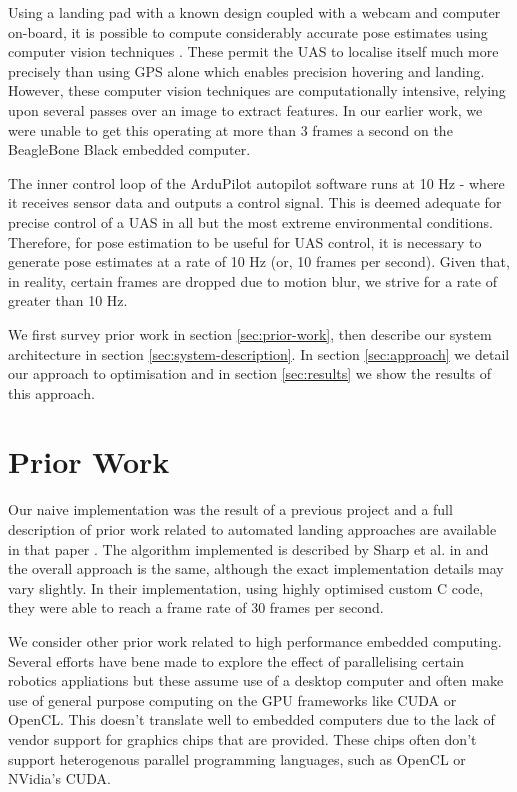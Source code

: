 \documentclass{acm_proc_article-sp}
\begin{document}
Using a landing pad with a known design coupled with a webcam and computer on-board, it is possible to compute considerably accurate pose estimates using computer vision techniques \cite{berzanaccurate}. These permit the UAS to localise itself much more precisely than using GPS alone which enables precision hovering and landing. However, these computer vision techniques are computationally intensive, relying upon several passes over an image to extract features. In our earlier work, we were unable to get this operating at more than 3 frames a second on the BeagleBone Black embedded computer. 

The inner control loop of the ArduPilot autopilot software runs at 10 Hz - where it receives sensor data and outputs a control signal. This is deemed adequate for precise control of a UAS in all but the most extreme environmental conditions. Therefore, for pose estimation to be useful for UAS control, it is necessary to generate pose estimates at a rate of 10 Hz (or, 10 frames per second). Given that, in reality, certain frames are dropped due to motion blur, we strive for a rate of greater than 10 Hz.

We first survey prior work in section \ref{sec:prior-work}, then describe our system architecture in section \ref{sec:system-description}. In section \ref{sec:approach} we detail our approach to optimisation and in section \ref{sec:results} we show the results of this approach.

\section{Prior Work\label{sec:prior-work}}
Our naive implementation was the result of a previous project and a full description of prior work related to automated landing approaches are available in that paper \cite{berzanaccurate}. The algorithm implemented is described by Sharp et al. in \cite{sharp_et_al_2001} and the overall approach is the same, although the exact implementation details may vary slightly. In their implementation, using highly optimised custom C code, they were able to reach a frame rate of 30 frames per second. 

We consider other prior work related to high performance embedded computing. Several efforts have bene made to explore the effect of parallelising certain robotics appliations but these assume use of a desktop computer and often make use of general purpose computing on the GPU frameworks like CUDA or OpenCL. This doesn't translate well to embedded computers due to the lack of vendor support for graphics chips that are provided. These chips often don't support heterogenous parallel programming languages, such as OpenCL or NVidia's CUDA. 
\end{document}
